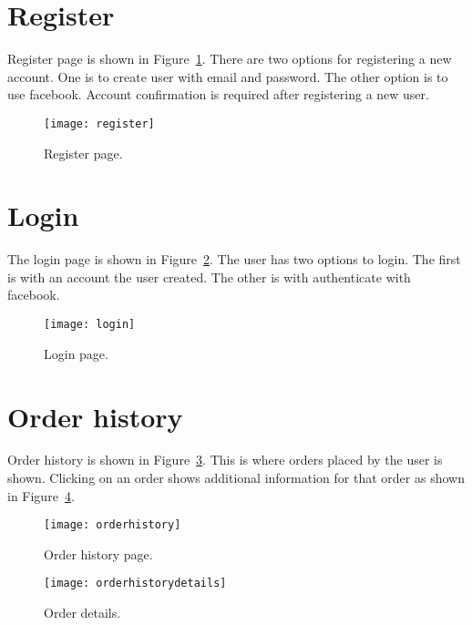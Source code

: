 \documentclass[11pt,a4paper,english]{article}
\begin{document}
\section*{Register}
Register page is shown in Figure~\ref{fig:register}. There are two options for registering a new account. One is to create user with email and password. The other option is to use facebook. Account confirmation is required after registering a new user.
\begin{figure}[htbp]
  \centering
  \texttt{[image: register]}
  \caption{Register page.}
  \label{fig:register}
\end{figure}
\section*{Login}
The login page is shown in Figure~\ref{fig:login}. The user has two options to login. The first is with an account the user created. The other is with authenticate with facebook.
\begin{figure}[htbp]
  \centering
  \texttt{[image: login]}
  \caption{Login page.}
  \label{fig:login}
\end{figure}
\section*{Order history}
Order history is shown in Figure~\ref{fig:history}. This is where orders placed by the user is shown. Clicking on an order shows additional information for that order as shown in Figure~\ref{fig:historydetails}.
\begin{figure}[htbp]
  \centering
  \texttt{[image: orderhistory]}
  \caption{Order history page.}
  \label{fig:history}
\end{figure}
\begin{figure}[htbp]
  \centering
  \texttt{[image: orderhistorydetails]}
  \caption{Order details.}
  \label{fig:historydetails}
\end{figure}
\end{document}
